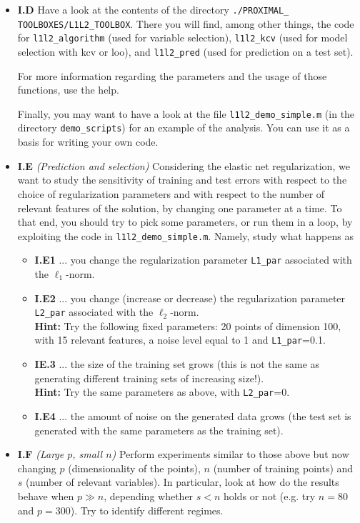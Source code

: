 \documentclass[DIN, pagenumber=false, fontsize=11pt, parskip=half]{scrartcl}
\begin{document}
\begin{itemize}


	\item \textbf{I.D} 	Have a look at the contents of the directory \texttt{./PROXIMAL\_} \texttt{TOOLBOXES/L1L2\_TOOLBOX}.
	There you will find, among other things, the code for  \texttt{l1l2\_algorithm} (used for variable selection), \texttt{l1l2\_kcv} (used for model selection with kcv or loo), and \texttt{l1l2\_pred} (used for prediction on a test set).

For more information regarding the parameters and the usage of those functions, use the help.

Finally, you may want to have a look at the file \texttt{l1l2\_demo\_simple.m} (in the directory \texttt{demo\_scripts}) for an example of the analysis.
You can use it as a basis for writing your own code.

	\item \textbf{I.E} \emph{(Prediction and selection)}
	Considering the elastic net regularization, we want to study the sensitivity of training and test errors with respect to the choice of regularization parameters and with respect to the number of relevant features of the solution, by changing one parameter at a time.
	To that end, you should try to pick some parameters, or run them in a loop, by exploiting the code in \texttt{l1l2\_demo\_simple.m}.
  Namely, study what happens as

\begin{itemize}
  \item \textbf{I.E1} ... you change the  regularization parameter \texttt{L1\_par} associated with the $\ell_1$-norm.
  \item \textbf{I.E2} ... you change (increase or decrease) the regularization parameter \texttt{L2\_par} associated with the $\ell_2$-norm.\\
  \textbf{Hint:} Try the following fixed parameters: 20 points of dimension 100, with 15 relevant features, a noise level equal to 1 and \texttt{L1\_par}=0.1.
  \item \textbf{IE.3} ... the size of the training set grows (this is not the same as generating different training sets of increasing size!).\\
  \textbf{Hint:} Try the same parameters as above, with \texttt{L2\_par}=0.
  \item \textbf{I.E4} ... the amount of noise on the generated data grows (the test set is generated with the same parameters as the training set).
\end{itemize}




	\item \textbf{I.F} \emph{(Large $p$, small $n$)} Perform experiments similar to those above but now changing $p$ (dimensionality of the points), $n$ (number of training points) and $s$ (number of relevant variables).
	In particular, look at how do the results behave when $p\gg n$, depending whether $s<n$ holds or not (e.g. try $n=80$ and $p=300$).
  Try to identify different regimes.

\end{itemize}
\end{document}
